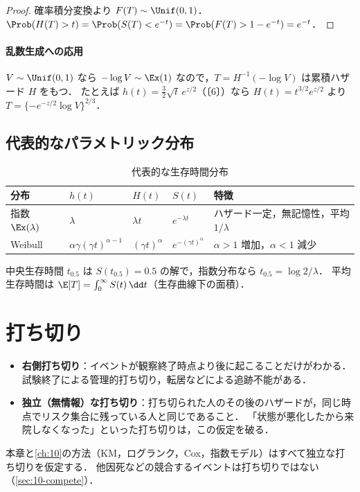 \begin{proof}
確率積分変換より $F(T)\sim\Unif(0,1)$．
$\Prob(H(T)>t)=\Prob(S(T)<e^{-t})=\Prob(F(T)>1-e^{-t})=e^{-t}$．
\end{proof}
\paragraph{乱数生成への応用}
$V\sim\Unif(0,1)$ なら $-\log V\sim\Ex(1)$ なので，$T=H^{-1}(-\log V)$ は累積ハザード $H$ をもつ．
たとえば $h(t)=\frac32\sqrt t\,e^{z/2}$（〔6〕）なら $H(t)=t^{3/2}e^{z/2}$ より $T=\{-e^{-z/2}\log V\}^{2/3}$．

\subsection{代表的なパラメトリック分布}\label{subsec:09-param}
\begin{table}[htbp]
\centering\small
\caption{代表的な生存時間分布}\label{tab:09-dist}
\begin{tabular}{@{}lllll@{}}
\toprule
分布 & $h(t)$ & $H(t)$ & $S(t)$ & 特徴\\
\midrule
指数 $\Ex(\lambda)$ & $\lambda$ & $\lambda t$ & $e^{-\lambda t}$ & ハザード一定，無記憶性，平均 $1/\lambda$\\
Weibull & $\alpha\gamma(\gamma t)^{\alpha-1}$ & $(\gamma t)^{\alpha}$ & $e^{-(\gamma t)^\alpha}$ & $\alpha>1$ 増加，$\alpha<1$ 減少\\
\bottomrule
\end{tabular}
\end{table}
中央生存時間 $t_{0.5}$ は $S(t_{0.5})=0.5$ の解で，指数分布なら $t_{0.5}=\log2/\lambda$．
平均生存時間は $\E[T]=\int_0^\infty S(t)\,\dd t$（生存曲線下の面積）．

\section{打ち切り}\label{sec:09-censor}
\begin{itemize}
\item \textbf{右側打ち切り}：イベントが観察終了時点より後に起こることだけがわかる．試験終了による管理的打ち切り，転居などによる追跡不能がある．
\item \textbf{独立（無情報）な打ち切り}：打ち切られた人のその後のハザードが，同じ時点でリスク集合に残っている人と同じであること．
      「状態が悪化したから来院しなくなった」といった打ち切りは，この仮定を破る．
\end{itemize}
本章と\cref{ch:10}の方法（KM，ログランク，Cox，指数モデル）はすべて独立な打ち切りを仮定する．
他因死などの競合するイベントは打ち切りではない（\cref{sec:10-compete}）．


